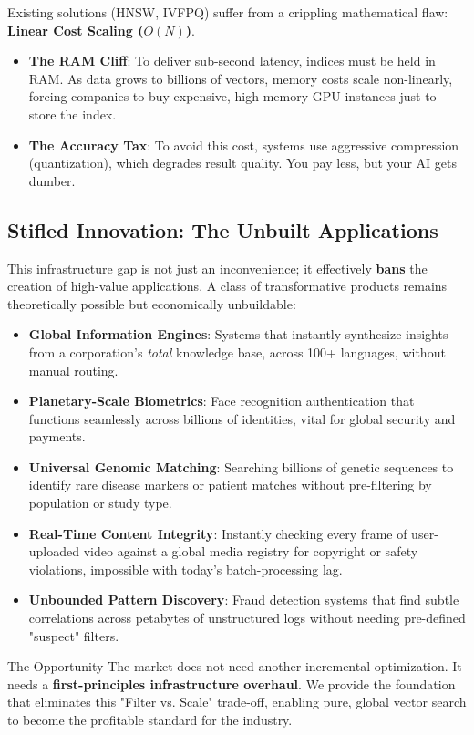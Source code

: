 Existing solutions (HNSW, IVFPQ) suffer from a crippling mathematical flaw: \textbf{Linear Cost Scaling ($O(N)$)}.
\begin{itemize}
    \item \textbf{The RAM Cliff}: To deliver sub-second latency, indices must be held in RAM. As data grows to billions of vectors, memory costs scale non-linearly, forcing companies to buy expensive, high-memory GPU instances just to store the index.
    \item \textbf{The Accuracy Tax}: To avoid this cost, systems use aggressive compression (quantization), which degrades result quality. You pay less, but your AI gets dumber.
\end{itemize}

\subsection{Stifled Innovation: The Unbuilt Applications}
This infrastructure gap is not just an inconvenience; it effectively \textbf{bans} the creation of high-value applications. A class of transformative products remains theoretically possible but economically unbuildable:

\begin{itemize}
    \item \textbf{Global Information Engines}: Systems that instantly synthesize insights from a corporation's \textit{total} knowledge base, across 100+ languages, without manual routing.
    \item \textbf{Planetary-Scale Biometrics}: Face recognition authentication that functions seamlessly across billions of identities, vital for global security and payments.
    \item \textbf{Universal Genomic Matching}: Searching billions of genetic sequences to identify rare disease markers or patient matches without pre-filtering by population or study type.
    \item \textbf{Real-Time Content Integrity}: Instantly checking every frame of user-uploaded video against a global media registry for copyright or safety violations, impossible with today's batch-processing lag.
    \item \textbf{Unbounded Pattern Discovery}: Fraud detection systems that find subtle correlations across petabytes of unstructured logs without needing pre-defined "suspect" filters.
\end{itemize}

\vspace{0.5cm}
\begin{cosmabox}[cosmaBlue]{The Opportunity}
The market does not need another incremental optimization. It needs a \textbf{first-principles infrastructure overhaul}. We provide the foundation that eliminates this "Filter vs. Scale" trade-off, enabling pure, global vector search to become the profitable standard for the industry.
\end{cosmabox}
